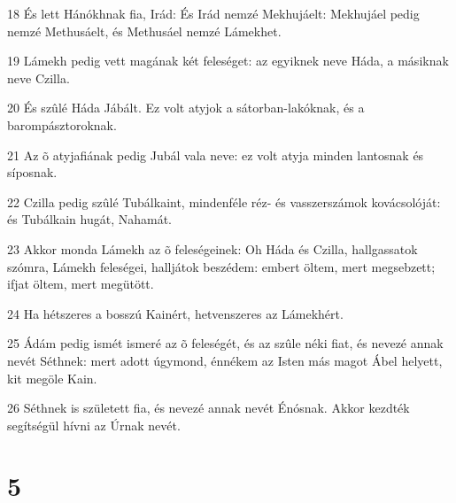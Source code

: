 \par 18 És lett Hánókhnak fia, Irád: És Irád nemzé Mekhujáelt: Mekhujáel pedig nemzé Methusáelt, és Methusáel nemzé Lámekhet.
\par 19 Lámekh pedig vett magának két feleséget: az egyiknek neve Háda, a másiknak neve Czilla.
\par 20 És szûlé Háda Jábált. Ez volt atyjok a sátorban-lakóknak, és a barompásztoroknak.
\par 21 Az õ atyjafiának pedig Jubál vala neve: ez volt atyja minden lantosnak és síposnak.
\par 22 Czilla pedig szûlé Tubálkaint, mindenféle réz- és vasszerszámok kovácsolóját: és Tubálkain hugát, Nahamát.
\par 23 Akkor monda Lámekh az õ feleségeinek: Oh Háda és Czilla, hallgassatok szómra, Lámekh feleségei, halljátok beszédem: embert öltem, mert megsebzett; ifjat öltem, mert megütött.
\par 24 Ha hétszeres a bosszú Kainért, hetvenszeres az Lámekhért.
\par 25 Ádám pedig ismét ismeré az õ feleségét, és az szûle néki fiat, és nevezé annak nevét Séthnek: mert adott úgymond, énnékem az Isten más magot Ábel helyett, kit megöle Kain.
\par 26 Séthnek is született fia, és nevezé annak nevét Énósnak. Akkor kezdték segítségül hívni az Úrnak nevét.

\chapter{5}

